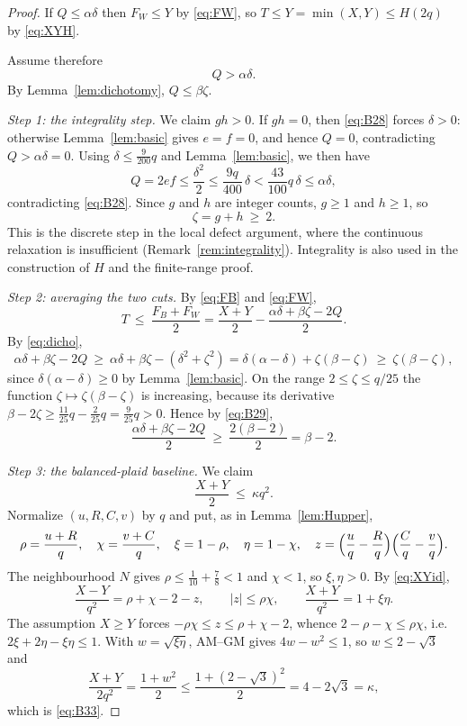 \documentclass[11pt]{amsart}
\theoremstyle{definition}
\theoremstyle{remark}
\begin{document}
\begin{proof}
If $Q\le\alpha\delta$ then $F_W\le Y$ by \eqref{eq:FW}, so $T\le Y=\min(X,Y)\le H(2q)$ by \eqref{eq:XYH}.

Assume therefore
\begin{equation}\label{eq:B28}
Q>\alpha\delta .
\end{equation}
By Lemma~\ref{lem:dichotomy}, $Q\le\beta\zeta$.

\emph{Step 1: the integrality step.} We claim $gh>0$.  If $gh=0$, then
\eqref{eq:B28} forces $\delta>0$: otherwise Lemma~\ref{lem:basic} gives
$e=f=0$, and hence $Q=0$, contradicting $Q>\alpha\delta=0$.  Using
$\delta\le\frac{9}{200}q$ and Lemma~\ref{lem:basic}, we then have
\[
Q=2ef\le\frac{\delta^2}{2}\le\frac{9q}{400}\,\delta<\frac{43}{100}q\,\delta\le\alpha\delta ,
\]
contradicting \eqref{eq:B28}. Since $g$ and $h$ are integer counts, $g\ge1$ and $h\ge1$, so
\begin{equation}\label{eq:B29}
\zeta=g+h\ \ge\ 2 .
\end{equation}
This is the discrete step in the local defect argument, where the continuous
relaxation is insufficient (Remark~\ref{rem:integrality}). Integrality is also
used in the construction of $H$ and the finite-range proof.

\emph{Step 2: averaging the two cuts.} By \eqref{eq:FB} and \eqref{eq:FW},
\begin{equation}\label{eq:B30}
T\ \le\ \frac{F_B+F_W}{2}=\frac{X+Y}{2}-\frac{\alpha\delta+\beta\zeta-2Q}{2}.
\end{equation}
By \eqref{eq:dicho},
\begin{equation}\label{eq:B31}
\alpha\delta+\beta\zeta-2Q\ \ge\ \alpha\delta+\beta\zeta-(\delta^2+\zeta^2)=\delta(\alpha-\delta)+\zeta(\beta-\zeta)\ \ge\ \zeta(\beta-\zeta),
\end{equation}
since $\delta(\alpha-\delta)\ge0$ by Lemma~\ref{lem:basic}. On the range $2\le\zeta\le q/25$ the function $\zeta\mapsto\zeta(\beta-\zeta)$ is increasing, because its derivative $\beta-2\zeta\ge\frac{11}{25}q-\frac{2}{25}q=\frac9{25}q>0$. Hence by \eqref{eq:B29},
\begin{equation}\label{eq:B32}
\frac{\alpha\delta+\beta\zeta-2Q}{2}\ \ge\ \frac{2(\beta-2)}{2}=\beta-2 .
\end{equation}

\emph{Step 3: the balanced-plaid baseline.} We claim
\begin{equation}\label{eq:B33}
\frac{X+Y}{2}\ \le\ \kappa q^2 .
\end{equation}
Normalize $(u,R,C,v)$ by $q$ and put, as in Lemma~\ref{lem:Hupper},
\[
\rho=\frac{u+R}{q},\quad \chi=\frac{v+C}{q},\quad \xi=1-\rho,\quad \eta=1-\chi,\quad
z=\Bigl(\frac uq-\frac Rq\Bigr)\Bigl(\frac Cq-\frac vq\Bigr).
\]
The neighbourhood $N$ gives $\rho\le\frac1{10}+\frac78<1$ and $\chi<1$, so $\xi,\eta>0$. By \eqref{eq:XYid},
\[
\frac{X-Y}{q^2}=\rho+\chi-2-z,\qquad |z|\le\rho\chi,\qquad \frac{X+Y}{q^2}=1+\xi\eta .
\]
The assumption $X\ge Y$ forces $-\rho\chi\le z\le\rho+\chi-2$, whence $2-\rho-\chi\le\rho\chi$, i.e.\ $2\xi+2\eta-\xi\eta\le1$. With $w=\sqrt{\xi\eta}$, AM--GM gives $4w-w^2\le1$, so $w\le2-\sqrt3$ and
\[
\frac{X+Y}{2q^2}=\frac{1+w^2}{2}\le\frac{1+(2-\sqrt3)^2}{2}=4-2\sqrt3=\kappa ,
\]
which is \eqref{eq:B33}.


\end{proof}
\end{document}

